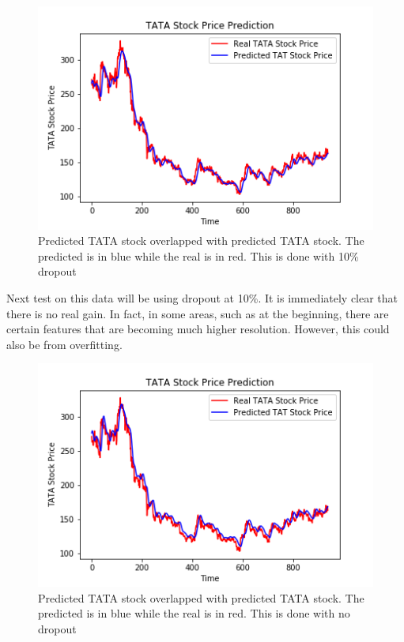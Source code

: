 \documentclass[12pt]{article}
\begin{document}
\begin{figure}[H]
  \includegraphics[width=\linewidth]{images/T2.png}
  \caption{Predicted TATA stock overlapped with predicted TATA stock. The predicted is in blue while the real is in red. This is done with 10\% dropout}
\end{figure}

Next test on this data will be using dropout at 10\%. It is immediately clear that there is no real gain. In fact, in some areas, such as at the beginning, there are certain features that are becoming much higher resolution. However, this could also be from overfitting. 

\begin{figure}[H]
  \includegraphics[width=\linewidth]{images/T3.png}
  \caption{Predicted TATA stock overlapped with predicted TATA stock. The predicted is in blue while the real is in red. This is done with no dropout}
\end{figure}
\end{document}
